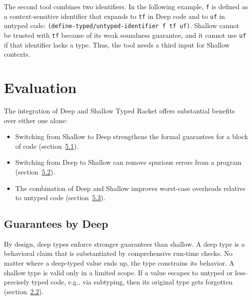 \documentclass[screen=true, natbib=false, 10pt, sigplan]{acmart}
\newcommand{\sectionNewpage}{}
\newcommand{\SecRef}[2]{section~#1}
\newcommand{\SectionNumberLink}[2]{\hyperref[#1]{#2}}
\newcommand{\Scribtexttt}[1]{{\texttt{#1}}}
\newlength{\stabLeft}
\newcommand{\atItemizeStart}[0]{\addtolength{\stabLeft}{\labelsep}
                                \addtolength{\stabLeft}{\labelwidth}}
\let\SOriginalthesubsection\thesubsection
\let\SOriginalthesubsubsection\thesubsubsection
\newcommand{\Ssection}[2]{\section[#1]{#2}\let\thesubsection\SOriginalthesubsection}
\newcommand{\Ssubsection}[2]{\subsection[#1]{#2}\let\thesubsubsection\SOriginalthesubsubsection}
\begin{document}
The second tool combines two identifiers.
In the following example, \Scribtexttt{f} is defined as a context{-}sensitive identifier
that expands to \Scribtexttt{tf} in Deep code and to \Scribtexttt{uf} in untyped code:
\Scribtexttt{(define{-}typed/untyped{-}identifier f tf uf)}.
\noindent{}Shallow cannot be trusted with \Scribtexttt{tf}
because of its weak soundness guarantee, and it cannot use
\Scribtexttt{uf} if that identifier lacks a type.
Thus, the tool needs a third input for Shallow
contexts.

\sectionNewpage

\Ssection{Evaluation}{Evaluation}\label{t:x28part_x22secx3aevaluationx22x29}

The integration of Deep and Shallow Typed Racket offers substantial
benefits over either one alone:


\noindent \begin{itemize}\atItemizeStart

\item Switching from Shallow to Deep strengthens the formal guarantees
for a block of code (\SecRef{\SectionNumberLink{t:x28part_x22secx3aevaluationx3aguaranteesx22x29}{5.1}}{Guarantees by Deep}).

\item Switching from Deep to Shallow can remove spurious errors
from a program (\SecRef{\SectionNumberLink{t:x28part_x22secx3aevaluationx3aexpressivenessx22x29}{5.2}}{Expressiveness by Shallow}).

\item The combination of Deep and Shallow improves worst{-}case
overheads relative to untyped code (\SecRef{\SectionNumberLink{t:x28part_x22secx3aevaluationx3aperformancex22x29}{5.3}}{Performance by Deep and Shallow}).\end{itemize}

\Ssubsection{Guarantees by Deep}{Guarantees by Deep}\label{t:x28part_x22secx3aevaluationx3aguaranteesx22x29}

By design, deep types enforce stronger guarantees than shallow.
A deep type is a behavioral claim that is substantiated by comprehensive
run{-}time checks.
No matter where a deep{-}typed value ends up, the type constrains its behavior.
A shallow type is valid only in a limited scope.
If a value escapes to untyped or less{-}precisely typed code, e.g., via subtyping,
then its original type gets forgotten (\SecRef{\SectionNumberLink{t:x28part_x22secx3abackgroundx3adeepx2dshallowx22x29}{2.2}}{Deep and Shallow Types}).
\end{document}
